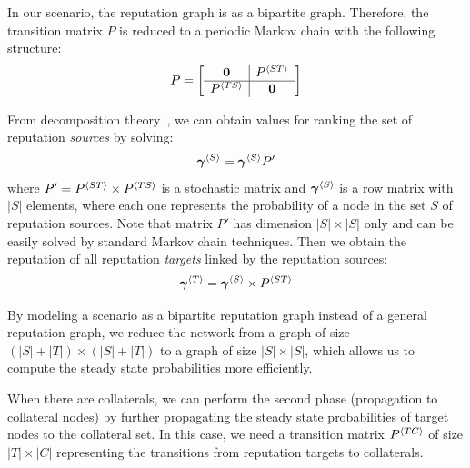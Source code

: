 \documentclass[notitlepage]{svjour3}
\begin{document}

In our scenario, the reputation graph is as a bipartite graph. Therefore, the transition matrix $P$ is reduced to a periodic Markov chain with the following structure:
\begin{align}\label{eq:p}
P 
=
\left[
\begin{array}{c | c}
{\bf 0}      &P{^{\langle ST \rangle}} \\
\hline
P{^{\langle TS \rangle}}  &{\bf 0}    \\
\end{array}
\right]
\end{align}

From decomposition theory~\cite{meyer89}, we can obtain values for ranking the set of reputation {\em sources} by solving:
\begin{align}
\label{eq:top-rank}
{\mbox{\boldmath $\gamma$}}{^{\langle S \rangle}} = {\mbox{\boldmath $\gamma$}}{^{\langle S \rangle}} P'
\end{align}
\noindent where $P^\prime = P{^{\langle ST \rangle}} \times P{^{\langle TS \rangle}}$ is a stochastic matrix and ${\mbox{\boldmath $\gamma$}}{^{\langle S \rangle}}$ is a row matrix with $|S|$ elements, where each one represents the probability of a node in the set $S$ of reputation sources.
%
Note that matrix $P'$ has dimension $|S| \times |S|$ only and can be easily solved by standard Markov chain techniques.
Then we obtain the reputation of all reputation \emph{targets} linked by the reputation sources:
\begin{align}
\label{eq:venue-rank}
{\mbox{\boldmath $\gamma$}}{^{\langle T \rangle}} = {\mbox{\boldmath $\gamma$}}{^{\langle S \rangle}} \times P{^{\langle ST \rangle}}
\end{align}

By modeling a scenario as a bipartite reputation graph instead of a general reputation graph, we reduce the network from a graph of size $(|S|+|T|)\times (|S|+|T|)$ to a graph of size $|S|\times |S|$, which allows us to compute the steady state probabilities more efficiently. %


When there are collaterals, we can perform the second phase (propagation to collateral nodes) 
by further propagating the steady state probabilities of target nodes to the collateral set. 
In this case, we need a transition matrix $P{^{\langle TC \rangle}}$ of size $|T|\times |C|$ representing
the transitions from reputation targets to collaterals.
\end{document}
